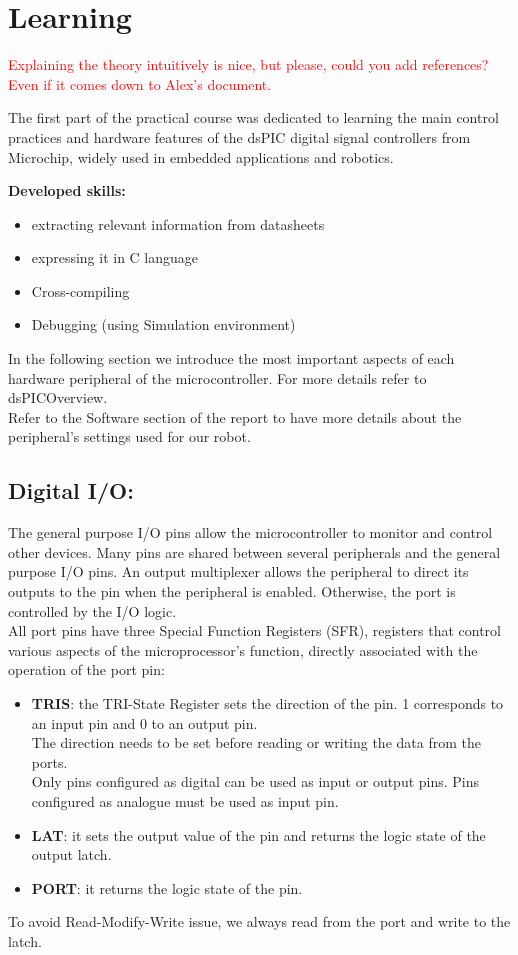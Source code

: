 \section{Learning}

\textcolor{red}{Explaining the theory intuitively is nice, but please, could you add references? Even if it comes down to Alex's document.}

The first part of the practical course was dedicated to learning the main control practices and hardware features of the dsPIC digital signal controllers from Microchip, widely used in embedded applications and robotics.

\textbf{Developed skills:}
\begin{itemize}
    \item extracting relevant information from datasheets
    \item expressing it in C language
    \item Cross-compiling
    \item Debugging (using Simulation environment)
\end{itemize}

In the following section we introduce the most important aspects of each hardware peripheral of the microcontroller. For more details refer to dsPICOverview.\\
Refer to the Software section of the report to have more details about the peripheral’s settings used for our robot.

\subsection{Digital I/O:}

The general purpose I/O pins allow the microcontroller to monitor and control other devices.
Many pins are shared between several peripherals and the general purpose I/O pins.  An output multiplexer allows the peripheral to direct its outputs to the pin when the peripheral is enabled. Otherwise, the port is controlled by the I/O logic.\\
All port pins have three Special Function Registers (SFR), registers that control various aspects of the microprocessor's function, directly associated with the operation of the port pin:
\begin{itemize}
    \item \textbf{TRIS}: the TRI-State Register sets the direction of the pin. 1 corresponds to an input pin and 0 to an output pin.\\
    The direction needs to be set before reading or writing the data from the ports. \\
    Only pins configured as digital can be used as input or output pins. Pins configured as analogue must be used as input pin.
    \item \textbf{LAT}: it sets the output value of the pin and returns the logic state of the output latch.
    \item \textbf{PORT}: it returns the logic state of the pin. 
\end{itemize}
To avoid Read-Modify-Write issue, we always read from the port and write to the latch.

